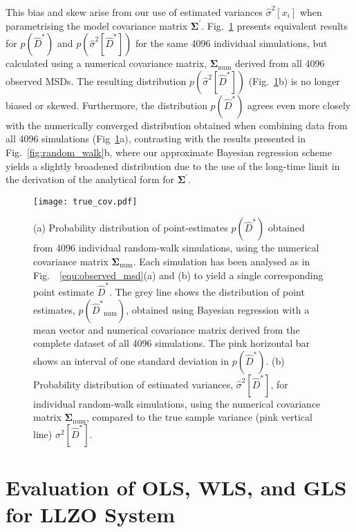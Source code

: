 \documentclass[reprint,superscriptaddress,nobibnotes,amsmath,amssymb,aps,prx,hidelinks,linenumbers]{revtex4-2}
\newcommand{\oMSDi}{\ensuremath{x_i}}
\newcommand{\prob}[1]{\ensuremath{p(#1)}}
\newcommand{\Dest}{\ensuremath{\widehat{D}^*}}
\newcommand{\var}[1]{\ensuremath{\sigma^2[#1]}}
\newcommand{\varest}[1]{\ensuremath{\widehat{\sigma}^2[#1]}}
\begin{document}
This bias and skew arise from our use of estimated variances $\varest{\oMSDi}$ when parametrising the model covariance matrix $\bm{\Sigma^\prime}$.
Fig.~\ref{fig:true_cov} presents equivalent results for $\prob{\Dest}$ and $\prob{\varest{\Dest}}$ for the same \num{4096} individual simulations, but calculated using a numerical covariance matrix, $\bm{\Sigma}_\mathrm{num}$ derived from all \num{4096} observed MSDs.
The resulting distribution $\prob{\varest{\Dest}}$ (Fig.~\ref{fig:true_cov}b) is no longer biased or skewed.
Furthermore, the distribution $\prob{\Dest}$ agrees even more closely with the numerically converged distribution obtained when combining data from all \num{4096} simulations (Fig~\ref{fig:true_cov}a), contrasting with the results presented in Fig.~\ref{fig:random_walk}b, where our approximate Bayesian regression scheme yields a slightly broadened distribution due to the use of the long-time limit in the derivation of the analytical form for $\bm{\Sigma^\prime}$.
\begin{figure}
    \centering
    \texttt{[image: true\_cov.pdf]}
    \caption{
        (a) Probability distribution of point-estimates $\prob{\Dest}$ obtained from \num{4096} individual random-walk simulations, using the numerical covariance matrix $\bm{\Sigma}_\mathrm{num}$.
        Each simulation has been analysed as in Fig.~~\ref{equ:observed_msd}(a) and (b) to yield a single corresponding point estimate $\Dest$.
        The grey line shows the distribution of point estimates, $\prob{\Dest_\mathrm{num}}$, obtained using Bayesian regression with a mean vector and numerical covariance matrix derived from the complete dataset of all \num{4096} simulations.
        The pink horizontal bar shows an interval of one standard deviation in $\prob{\Dest}$.
        (b) Probability distribution of estimated variances, $\varest{\Dest}$, for individual random-walk simulations, using the numerical covariance matrix $\bm{\Sigma}_\mathrm{num}$, compared to the true sample variance (pink vertical line) $\var{\Dest}$.
        }
    \label{fig:true_cov}
\end{figure}

\section{Evaluation of OLS, WLS, and GLS for LLZO System}
\end{document}

